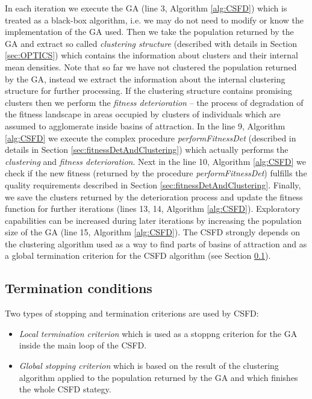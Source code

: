 In each iteration we execute the   
GA (line 3, Algorithm \ref{alg:CSFD}) which is
treated as a black-box algorithm, i.e. we may do not need to modify or know the
implementation of the GA used. Then we take the population returned by
the GA and extract so called \textit{clustering structure} (described 
with details in Section \ref{sec:OPTICS}) which contains the information about 
clusters and their internal mean densities.
Note that so far we have not clustered the population returned by
the GA, instead we extract the information about the internal clustering structure
for further processing.
If the clustering structure contains promising clusters then we perform the
\textit{fitness deterioration} -- the process of degradation of the fitness
landscape in areas occupied by clusters of individuals which are assumed
to agglomerate inside basins of attraction. 
In the line 9, Algorithm \ref{alg:CSFD} we execute the complex
procedure \textit{performFitnessDet} (described in details in Section
\ref{sec:fitnessDetAndClustering}) which actually performs the
\textit{clustering} and \textit{fitness deterioration}. Next in the line 10, 
Algorithm \ref{alg:CSFD} we check if the new fitness 
(returned by the procedure \textit{performFitnessDet}) fulfills the 
quality requirements described in Section \ref{sec:fitnessDetAndClustering}. 
Finally, we save the clusters returned by the deterioration process and update 
the fitness function for further iterations (lines 13, 14, Algorithm \ref{alg:CSFD}).
Exploratory capabilities can be increased during later iterations by
increasing the population size of the GA (line 15, Algorithm \ref{alg:CSFD}). 
The CSFD strongly depends on the clustering algorithm used as a way to find
parts of basins of attraction and as a global termination criterion for 
the CSFD algorithm (see Section \ref{sec:TermConditions}).



\subsection{Termination conditions}
\label{sec:TermConditions}



Two types of stopping and termination criterions 
are used by CSFD: 

\begin{itemize}
  
  \item 
  \textit{Local termination criterion} which is used as a stoppng criterion
  for the GA inside the main loop of the CSFD.  
  
  \item 
  \textit{Global stopping criterion} which is based on the result of the
  clustering algorithm applied to the population returned by the GA 
  and which finishes the whole CSFD stategy.

\end{itemize}


